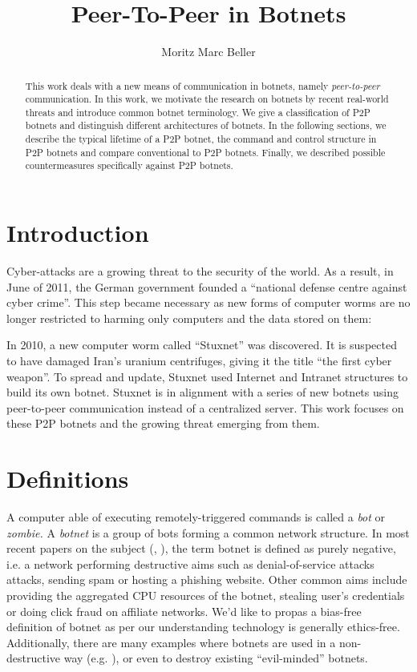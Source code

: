 \documentclass{llncs}
\title{Peer-To-Peer in Botnets}
\author{Moritz Marc Beller}
\institute{%
   Fakultät für Informatik, \\
   Technische Universität München \\
   \email{\{beller\}@in.tum.de}
}
\begin{document}
\maketitle

\begin{abstract}
This work deals with a new means of communication in botnets, namely
{\it peer-to-peer} communication.  In this work, we motivate the research on botnets by recent real-world threats and introduce common botnet terminology. We give a classification of P2P botnets and distinguish different architectures of botnets. In the following sections, we describe the typical lifetime of a P2P botnet, the command and control structure in P2P botnets and compare conventional to P2P botnets. Finally, we described possible countermeasures specifically against P2P botnets.
\end{abstract}

\section{Introduction}
Cyber-attacks are a growing threat to the security of the world. As a
result, in June of 2011, the German government founded a ``national
defense centre against cyber crime''.\cite{cyber} This step became
necessary as new forms of computer worms are no longer restricted to
harming only computers and the data stored on them:

 In 2010, a new computer worm called ``Stuxnet'' was discovered. It is
 suspected to have damaged Iran's uranium centrifuges, giving it the
 title ``the first cyber weapon''\cite{benzin2011first}. To spread and
 update, Stuxnet used Internet and Intranet structures to build its
 own botnet.\cite{fallierew32} Stuxnet is in alignment with a series
 of new botnets using peer-to-peer communication instead of a
 centralized server. This work focuses on these P2P botnets and the
 growing threat emerging from them.


\section{Definitions}
A computer able of executing remotely-triggered commands is called a
{\it bot} or {\it zombie.} A {\it botnet} is a group of bots forming a
common network structure.\cite{schoof2007detecting} In most recent
papers on the subject (\cite{wang2009systematic},
\cite{abu2006multifaceted}), the term botnet is defined as purely
negative, i.e. a network performing destructive aims such as
denial-of-service attacks attacks, sending spam or hosting a phishing
website\cite{steggink2007detection}. Other common aims include
providing the aggregated CPU resources of the botnet, stealing user's
credentials \cite{borgaonkar2010analysis} or doing click fraud on
affiliate networks\cite{clickFraud}. We'd like to propas a bias-free
definition of botnet as per our understanding technology is generally
ethics-free. Additionally, there are many examples where botnets are
used in a non-destructive way (e.g. \cite{seti}), or even to destroy
existing ``evil-minded'' botnets.
\end{document}
